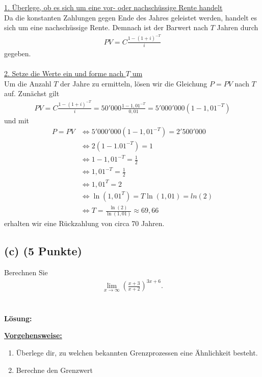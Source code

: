 \underline{1. Überlege, ob es sich um eine vor- oder nachschüssige Rente handelt}\\
Da die konstanten Zahlungen gegen Ende des Jahres geleistet werden, handelt es sich um eine nachschüssige Rente. Demnach ist der Barwert nach $T$ Jahren durch
\begin{align*}
PV =  C \frac{1-(1+i)^{-T}}{i}
\end{align*}
gegeben.\\
\\
\underline{2. Setze die Werte ein und forme nach $T$ um}\\
Um die Anzahl $T$ der Jahre zu ermitteln, lösen wir die Gleichung $P = PV$ nach $T$ auf. Zunächst gilt
\begin{align*}
PV = C \frac{1-(1+i)^{-T}}{i} 
= 50'000 \frac{1-1,01^{-T}}{0,01}
= 5'000'000 (1-1,01^{-T}) 
\end{align*}
und mit 
\begin{align*}
P = PV 
&\Leftrightarrow
5'000'000(1-1,01^{-T}) =2'500'000\\
&\Leftrightarrow
2(1-1.01^{-T})=1\\
&\Leftrightarrow
1-1,01^{-T} = \frac{1}{2}\\
&\Leftrightarrow
1,01^{-T} = \frac{1}{2}\\
&\Leftrightarrow
1,01^T = 2\\
&\Leftrightarrow
\ln(1,01^T) = T\ln(1,01) = ln(2)\\
&\Leftrightarrow
T = \frac{\ln(2)}{\ln(1,01)} \approx 69,66
\end{align*}
erhalten wir eine Rückzahlung von circa 70 Jahren.

\newpage

\subsection*{(c) (5 Punkte)}
Berechnen Sie 
\begin{align*}
\lim \limits_{x \rightarrow \infty} \left(\frac{x+3}{x+2}\right)^{3x+6}.
\end{align*}
\\
\\
\textbf{Lösung:}
\begin{mdframed}
\underline{\textbf{Vorgehensweise:}}
\begin{enumerate}
\item Überlege dir, zu welchen bekannten Grenzprozessen eine Ähnlichkeit besteht.
\item Berechne den Grenzwert   
\end{enumerate}
\end{mdframed}

